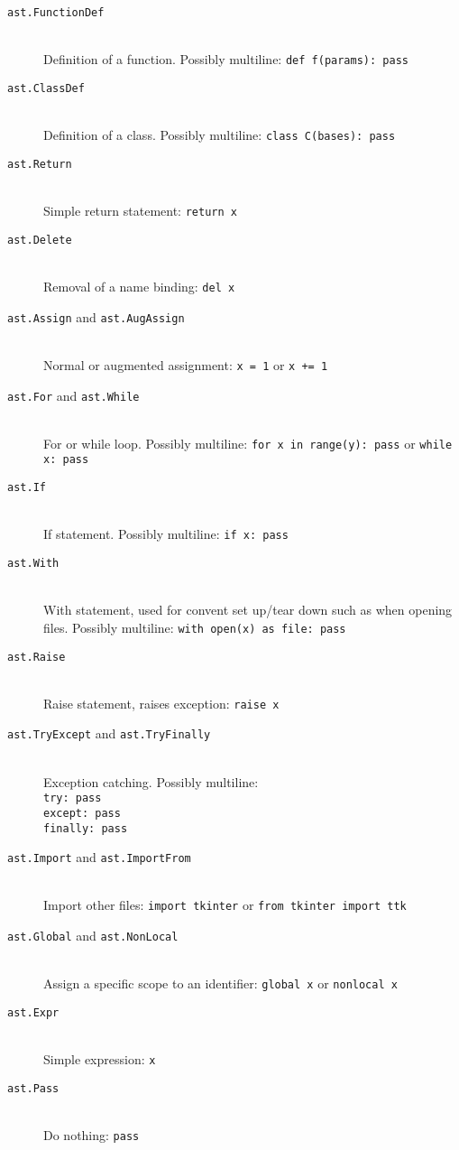 \documentclass[twoside,a4paper]{report}
\begin{document}
\begin{description}
\item[\texttt{ast.FunctionDef}] \hfill \\
Definition of a function. Possibly multiline: \texttt{def f(params): pass}
\item[\texttt{ast.ClassDef}] \hfill \\
Definition of a class. Possibly multiline: \texttt{class C(bases): pass}
\item[\texttt{ast.Return}] \hfill \\
Simple return statement: \texttt{return x}
\item[\texttt{ast.Delete}] \hfill \\
Removal of a name binding: \texttt{del x}
\item[\texttt{ast.Assign} and \texttt{ast.AugAssign}] \hfill \\
Normal or augmented assignment: \texttt{x = 1} or \texttt{x += 1}
\item[\texttt{ast.For} and \texttt{ast.While}] \hfill \\
For or while loop. Possibly multiline: \texttt{for x in range(y): pass} or \texttt{while x: pass}
\item[\texttt{ast.If}] \hfill \\
If statement. Possibly multiline: \texttt{if x: pass}
\item[\texttt{ast.With}] \hfill \\
With statement, used for convent set up/tear down such as when opening files. Possibly multiline: \texttt{with open(x) as file: pass}
\item[\texttt{ast.Raise}] \hfill \\
Raise statement, raises exception: \texttt{raise x}
\item[\texttt{ast.TryExcept} and \texttt{ast.TryFinally}] \hfill \\
Exception catching. Possibly multiline: \\
\texttt{try: pass} \\
\texttt{except: pass} \\
\texttt{finally: pass}
\item[\texttt{ast.Import} and \texttt{ast.ImportFrom}] \hfill \\
Import other files: \texttt{import tkinter} or \texttt{from tkinter import ttk}
\item[\texttt{ast.Global} and \texttt{ast.NonLocal}] \hfill \\
Assign a specific scope to an identifier: \texttt{global x} or \texttt{nonlocal x}
\item[\texttt{ast.Expr}] \hfill \\
Simple expression: \texttt{x}
\item[\texttt{ast.Pass}] \hfill \\
Do nothing: \texttt{pass}
\end{description}
\end{document}
